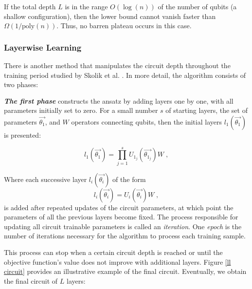 If the total depth $L$ is in the range $O(\log(n))$ of the number of qubits (a shallow configuration), then the lower bound cannot vanish faster than $\Omega(1/\mathrm{poly}(n))$.
Thus, no barren plateau occurs in this case.



\subsubsection{Layerwise Learning} \label{Sec: Layerwise Learning}

There is another method that manipulates the circuit depth throughout the training period studied by Skolik et al. \cite{skolikLayerwiseLearningQuantum2021}.
In more detail, the algorithm consists of two phases:

\textbf{\emph{The first phase}} constructs the ansatz by adding layers one by one, with all parameters initially set to zero. For a small number $s$ of starting layers, the set of parameters $\vec{\theta_1}$, and $W$ operators connecting qubits, then the initial layers $l_1(\vec{\theta_1})$ is presented:

\begin{equation}
    l_1(\vec{\theta_1})
    = \prod_{j=1}^s U_{1_j}(\vec{\theta_{1_j}}) W \;,
\end{equation}

Where each successive layer $l_i(\vec{\theta_i})$ of the form
\begin{equation}
    l_i(\vec{\theta_i})
    =U_i(\vec{\theta_i}) W \;,
\end{equation}
is added after repeated updates of the circuit parameters, at which point the parameters of all the previous layers become fixed.
The process responsible for updating all circuit trainable parameters is called an \emph{iteration}. One \emph{epoch} is the number of iterations necessary for the algorithm to process each training sample.

This process can stop when a certain circuit depth is reached or until the objective function's value does not improve with additional layers.
Figure \ref{ll circuit} provides an illustrative example of the final circuit.
Eventually, we obtain the final circuit of $L$ layers:

